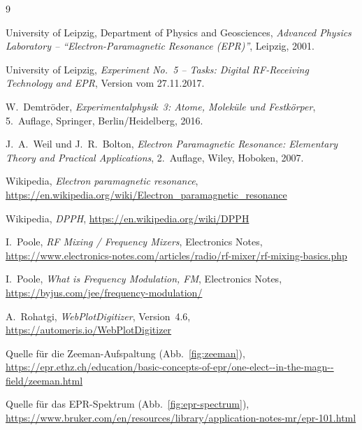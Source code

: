 \documentclass[11pt,a4paper]{article}
\begin{document}
\begin{thebibliography}{9}

University of Leipzig, Department of Physics and Geosciences,
\emph{Advanced Physics Laboratory -- ``Electron-Paramagnetic Resonance
(EPR)''}, Leipzig, 2001.

University of Leipzig, \emph{Experiment No.~5 -- Tasks: Digital RF-Receiving
Technology and EPR}, Version vom 27.11.2017.

W.~Demtröder, \emph{Experimentalphysik~3: Atome, Moleküle und Festkörper},
5.~Auflage, Springer, Berlin/Heidelberg, 2016.

J.~A.~Weil und J.~R.~Bolton, \emph{Electron Paramagnetic Resonance:
Elementary Theory and Practical Applications}, 2.~Auflage, Wiley, Hoboken,
2007.

Wikipedia, \emph{Electron paramagnetic resonance},
\url{https://en.wikipedia.org/wiki/Electron_paramagnetic_resonance}

Wikipedia, \emph{DPPH},
\url{https://en.wikipedia.org/wiki/DPPH}

I.~Poole, \emph{RF Mixing / Frequency Mixers}, Electronics Notes,
\url{https://www.electronics-notes.com/articles/radio/rf-mixer/rf-mixing-basics.php}

I.~Poole, \emph{What is Frequency Modulation, FM}, Electronics Notes,
\url{https://byjus.com/jee/frequency-modulation/}

A.~Rohatgi, \emph{WebPlotDigitizer}, Version~4.6,
\url{https://automeris.io/WebPlotDigitizer}

Quelle für die Zeeman-Aufspaltung (Abb.~\ref{fig:zeeman}),
\url{https://epr.ethz.ch/education/basic-concepts-of-epr/one-elect--in-the-magn--field/zeeman.html}

Quelle für das EPR-Spektrum (Abb.~\ref{fig:epr-spectrum}),
\url{https://www.bruker.com/en/resources/library/application-notes-mr/epr-101.html}

\end{thebibliography}
\end{document}
